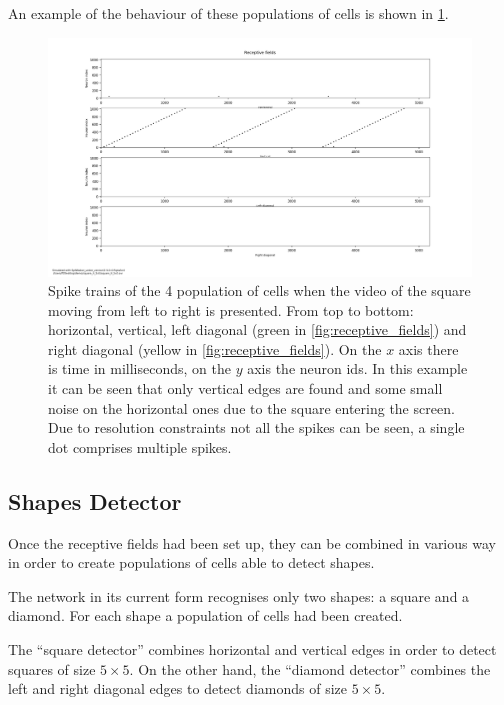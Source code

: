 An example of the behaviour of these populations of cells is shown in \cref{fig:receptive_fields_square_lr}.

\begin{figure}[ht]
\centering
\includegraphics[width=\textwidth]{images/development/receptive_fields_square_lr.png}
\caption[Receptive Fields Spike Trains of Square]{Spike trains of the 4 population of cells when the video of the square moving from left to right is presented. From top to bottom: horizontal, vertical, left diagonal (green in \cref{fig:receptive_fields}) and right diagonal (yellow in \cref{fig:receptive_fields}). On the $x$ axis there is time in milliseconds, on the $y$ axis the neuron ids. In this example it can be seen that only vertical edges are found and some small noise on the horizontal ones due to the square entering the screen. Due to resolution constraints not all the spikes can be seen, a single dot comprises multiple spikes.}
\label{fig:receptive_fields_square_lr}
\end{figure}

\subsection{Shapes Detector}
Once the receptive fields had been set up, they can be combined in various way in order to create populations of cells able to detect shapes.

The network in its current form recognises only two shapes: a square and a diamond. For each shape a population of cells had been created.

The ``square detector'' combines horizontal and vertical edges in order to detect squares of size $5 \times 5$. On the other hand, the ``diamond detector'' combines the left and right diagonal edges to detect diamonds of size $5 \times 5$. 

